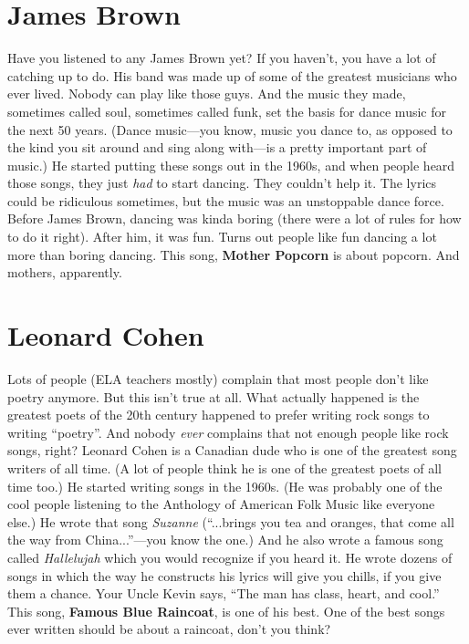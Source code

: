 \documentclass[letterpaper,single]{article}
\begin{document}
\section{James Brown}
Have you listened to any James Brown yet? If you haven't, you have a
lot of catching up to do. His band was made up of some of the greatest
musicians who ever lived. Nobody can play like those guys. And the music
they made, sometimes called soul, sometimes called funk, set the basis
for dance music for the next 50 years. (Dance music---you know, music
you dance to, as opposed to the kind you sit around and sing along
with---is a pretty important part of music.) He started putting these
songs out in the 1960s, and when people heard those songs, they just
\emph{had} to start dancing. They couldn't help it. The lyrics could
be ridiculous sometimes, but the music was an unstoppable dance force.
Before James Brown, dancing was kinda boring (there were a lot of rules
for how to do it right). After him, it was fun. Turns out people like
fun dancing a lot more than boring dancing. This song, \textbf{Mother
Popcorn} is about popcorn. And mothers, apparently.

\section{Leonard Cohen}
Lots of people (ELA teachers mostly) complain that most people don't
like poetry anymore. But this isn't true at all. What actually happened
is the greatest poets of the 20th century happened to prefer writing
rock songs to writing ``poetry''. And nobody \emph{ever} complains that
not enough people like rock songs, right? Leonard Cohen is a Canadian
dude who is one of the greatest song writers of all time. (A lot of
people think he is one of the greatest poets of all time too.) He
started writing songs in the 1960s. (He was probably one of the cool
people listening to the Anthology of American Folk Music like everyone
else.) He wrote that song \emph{Suzanne} (``...brings you tea and
oranges, that come all the way from China...''---you know the one.) And
he also wrote a famous song called \emph{Hallelujah} which you would
recognize if you heard it. He wrote dozens of songs in which the way he
constructs his lyrics will give you chills, if you give them a chance.
Your Uncle Kevin says, ``The man has class, heart, and cool.'' This
song, \textbf{Famous Blue Raincoat}, is one of his best. One of the best
songs ever written should be about a raincoat, don't you think? 
\end{document}

